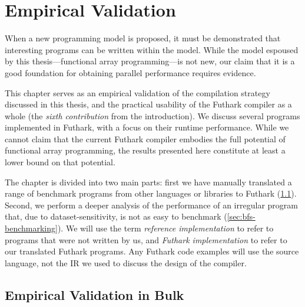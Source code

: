 \chapter{Empirical Validation}
\label{chap:empirical-validation}

When a new programming model is proposed, it must be demonstrated that
interesting programs can be written within the model.  While the model
espoused by this thesis---functional array programming---is not new,
our claim that it is a good foundation for obtaining parallel
performance requires evidence.

This chapter serves as an empirical validation of the compilation
strategy discussed in this thesis, and the practical usability of the
Futhark compiler as a whole (the \textit{sixth contribution} from the
introduction).  We discuss several programs implemented in Futhark,
with a focus on their runtime performance.  While we cannot claim that
the current Futhark compiler embodies the full potential of functional
array programming, the results presented here constitute at least a
lower bound on that potential.

The chapter is divided into two main parts: first we have manually
translated a range of benchmark programs from other languages or
libraries to Futhark (\cref{sec:bulk-benchmarking}).  Second, we
perform a deeper analysis of the performance of an irregular program
that, due to dataset-sensitivity, is not as easy to benchmark
(\cref{sec:bfs-benchmarking}).  We will use the term \textit{reference
  implementation} to refer to programs that were not written by us,
and \textit{Futhark implementation} to refer to our translated Futhark
programs.  Any Futhark code examples will use the source language, not
the IR we used to discuss the design of the compiler.

\section{Empirical Validation in Bulk}
\label{sec:bulk-benchmarking}

\newcommand\results[1]{ &  &  &  }

